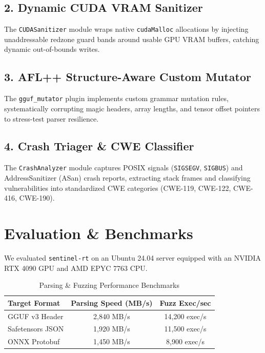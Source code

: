 \documentclass[10pt,twocolumn,a4paper]{article}
\begin{document}
\subsection{2. Dynamic CUDA VRAM Sanitizer}
The \texttt{CUDASanitizer} module wraps native \texttt{cudaMalloc} allocations by injecting unaddressable redzone guard bands around usable GPU VRAM buffers, catching dynamic out-of-bounds writes.

\subsection{3. AFL++ Structure-Aware Custom Mutator}
The \texttt{gguf\_mutator} plugin implements custom grammar mutation rules, systematically corrupting magic headers, array lengths, and tensor offset pointers to stress-test parser resilience.

\subsection{4. Crash Triager \& CWE Classifier}
The \texttt{CrashAnalyzer} module captures POSIX signals (\texttt{SIGSEGV}, \texttt{SIGBUS}) and AddressSanitizer (ASan) crash reports, extracting stack frames and classifying vulnerabilities into standardized CWE categories (CWE-119, CWE-122, CWE-416, CWE-190).

\section{Evaluation \& Benchmarks}
We evaluated \texttt{sentinel-rt} on an Ubuntu 24.04 server equipped with an NVIDIA RTX 4090 GPU and AMD EPYC 7763 CPU.

\begin{table}[h]
\centering
\caption{Parsing & Fuzzing Performance Benchmarks}
\label{tab:benchmarks}
\begin{tabular}{lcc}
\toprule
\textbf{Target Format} & \textbf{Parsing Speed (MB/s)} & \textbf{Fuzz Exec/sec} \\
\midrule
GGUF v3 Header         & 2,840 MB/s                    & 14,200 exec/s          \\
Safetensors JSON       & 1,920 MB/s                    & 11,500 exec/s          \\
ONNX Protobuf          & 1,450 MB/s                    & 8,900 exec/s           \\
\bottomrule
\end{tabular}
\end{table}
\end{document}
